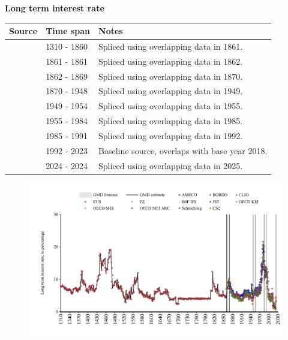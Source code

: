 \documentclass[12pt,a4paper,landscape]{article}
\begin{document}
\begin{adjustbox}{max totalsize={\paperwidth}{\paperheight},center}
\begin{minipage}[t][\textheight][t]{\textwidth}
\vspace*{0.5cm}
{}
\begin{center}
{\Large\bfseries Long term interest rate}
\end{center}
\vspace{0.5cm}
\begin{table}[H]
\centering
\small
\begin{tabular}{|l|l|l|}
\hline
\textbf{Source} & \textbf{Time span} & \textbf{Notes} \\
\hline
\rowcolor{white}\cite{Schmelzing}& 1310 - 1860 &Spliced using overlapping data in 1861. \\
\rowcolor{lightgray}\cite{CLIO}& 1861 - 1861 &Spliced using overlapping data in 1862. \\
\rowcolor{white}\cite{CS2_ITA}& 1862 - 1869 &Spliced using overlapping data in 1870. \\
\rowcolor{lightgray}\cite{JST}& 1870 - 1948 &Spliced using overlapping data in 1949. \\
\rowcolor{white}\cite{EUS}& 1949 - 1954 &Spliced using overlapping data in 1955. \\
\rowcolor{lightgray}\cite{OECD_MEI_ARC}& 1955 - 1984 &Spliced using overlapping data in 1985. \\
\rowcolor{white}\cite{EUS}& 1985 - 1991 &Spliced using overlapping data in 1992. \\
\rowcolor{lightgray}\cite{OECD_MEI}& 1992 - 2023 &Baseline source, overlaps with base year 2018. \\
\rowcolor{white}\cite{EUS}& 2024 - 2024 &Spliced using overlapping data in 2025. \\
\hline
\end{tabular}
\end{table}
\begin{figure}[H]
\centering
\includegraphics[width=\textwidth,height=0.6\textheight,keepaspectratio]{graphs/ITA_ltrate.pdf}
\end{figure}
\end{minipage}
\end{adjustbox}
\end{document}
